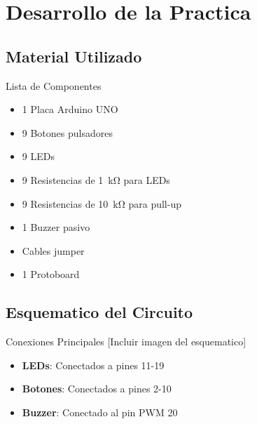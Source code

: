 
\section{Desarrollo de la Practica}

\subsection{Material Utilizado}
\begin{componentBox}{Lista de Componentes}
	\begin{itemize}[leftmargin=*,itemsep=1pt,parsep=1pt]
		\item 1 Placa Arduino UNO
		\item 9 Botones pulsadores
		\item 9 LEDs
		\item 9 Resistencias de \SI{1}{\kilo\ohm} para LEDs
		\item 9 Resistencias de \SI{10}{\kilo\ohm} para pull-up
		\item 1 Buzzer pasivo
		\item Cables jumper
		\item 1 Protoboard
	\end{itemize}
\end{componentBox}

\subsection{Esquematico del Circuito}
\begin{componentBox}{Conexiones Principales}
	[Incluir imagen del esquematico]
	\begin{itemize}[leftmargin=*,itemsep=1pt,parsep=1pt]
		\item \textbf{LEDs}: Conectados a pines 11-19
		\item \textbf{Botones}: Conectados a pines 2-10
		\item \textbf{Buzzer}: Conectado al pin PWM 20
	\end{itemize}
\end{componentBox}

